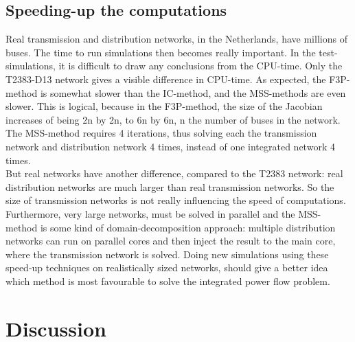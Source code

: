 \documentclass[10pt,journal]{article}
\begin{document}
\subsection{Speeding-up the computations}
Real transmission and distribution networks, in the Netherlands, have millions of buses. The time to run simulations then becomes really important. In the test-simulations, it is difficult to draw any conclusions from the CPU-time. Only the T2383-D13 network gives a visible difference in CPU-time. As expected, the F3P-method is somewhat slower than the IC-method, and the MSS-methods are even slower. This is logical, because in the F3P-method, the size of the Jacobian increases of being 2n by 2n, to 6n by 6n, n the number of buses in the network. The MSS-method requires 4 iterations, thus solving each the transmission network and distribution network 4 times, instead of one integrated network 4 times. \\
But real networks have another difference, compared to the T2383 network: real distribution networks are much larger than real transmission networks. So the size of transmission networks is not really influencing the speed of computations. Furthermore, very large networks, must be solved in parallel and the MSS-method is some kind of domain-decomposition approach: multiple distribution networks can run on parallel cores and then inject the result to the main core, where the transmission network is solved. Doing new simulations using these speed-up techniques on realistically sized networks, should give a better idea which method is most favourable to solve the integrated power flow problem. 
\section{Discussion}

\newpage

 
\end{document}
